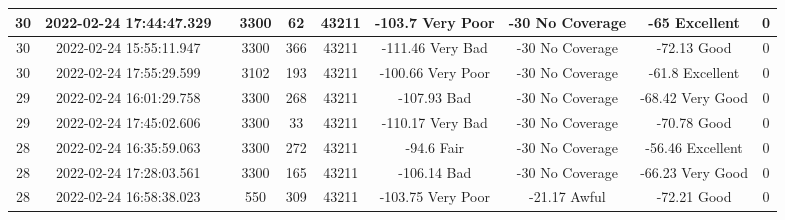 \begin{longtable*}{|c|c|c|c|c|c|c|c|c|c|}
30&2022-02-24 17:44:47.329&&3300&62&43211& -103.7    Very Poor   & -30       No Coverage & -65       Excellent   & 0\\\hline
{}30&2022-02-24 15:55:11.947&&3300&366&43211& -111.46   Very Bad    & -30       No Coverage & -72.13    Good        & 0\\\hline
{}30&2022-02-24 17:55:29.599&&3102&193&43211& -100.66   Very Poor   & -30       No Coverage & -61.8     Excellent   & 0\\\hline
{}29&2022-02-24 16:01:29.758&&3300&268&43211& -107.93   Bad         & -30       No Coverage & -68.42    Very Good   & 0\\\hline
{}29&2022-02-24 17:45:02.606&&3300&33&43211& -110.17   Very Bad    & -30       No Coverage & -70.78    Good        & 0\\\hline
{}28&2022-02-24 16:35:59.063&&3300&272&43211& -94.6     Fair        & -30       No Coverage & -56.46    Excellent   & 0\\\hline
{}28&2022-02-24 17:28:03.561&&3300&165&43211& -106.14   Bad         & -30       No Coverage & -66.23    Very Good   & 0\\\hline
{}28&2022-02-24 16:58:38.023&&550&309&43211& -103.75   Very Poor   & -21.17    Awful       & -72.21    Good        & 0\\\hline

\end{longtable*}
